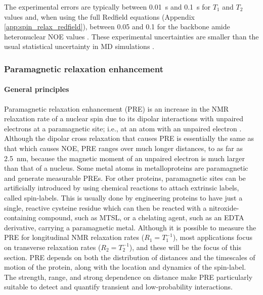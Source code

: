\documentclass[9pt,review]{livecoms}
\begin{document}
The experimental errors are typically between \qty{0.01}{\second} and \qty{0.1}{\second} for $T_1$ and $T_2$ values and, when using the full Redfield equations (Appendix \ref{app:spin_relax_redfield}), between 0.05 and 0.1 for the backbone amide heteronuclear NOE values \cite{hoch_biological_2023}.
These experimental uncertainties are smaller than the usual statistical uncertainty in MD simulations \cite{sandelin_qebss_2024}.

\subsubsection{Paramagnetic relaxation enhancement}
\label{sub2:pre}

\paragraph{General principles}

Paramagnetic relaxation enhancement (PRE) is an increase in the NMR relaxation rate of a nuclear spin due to its dipolar interactions with unpaired electrons at a paramagnetic site; i.e., at an atom with an unpaired electron \cite{clore_elucidating_2007,clore2009theory}.
Although the dipolar cross relaxation that causes PRE is essentially the same as that which causes NOE, PRE ranges over much longer distances, to as far as \qty{2.5}{\nano\meter}, because the magnetic moment of an unpaired electron is much larger than that of a nucleus.
Some metal atoms in metalloproteins are paramagnetic and generate measurable PREs.
For other proteins, paramagnetic sites can be artificially introduced by using chemical reactions to attach extrinsic labels, called spin-labels.
This is usually done by engineering proteins to have just a single, reactive cysteine residue which can then be reacted with a nitroxide-containing compound, such as MTSL, or a chelating agent, such as an EDTA derivative, carrying a paramagnetic metal.
Although it is possible to measure the PRE for longitudinal NMR relaxation rates ($R_1=T_1^{-1}$), most applications focus on transverse relaxation rates ($R_2=T_2^{-1}$), and these will be the focus of this section.
PRE depends on both the distribution of distances and the timescales of motion of the protein, along with the location and dynamics of the spin-label.
The strength, range, and strong dependence on distance make PRE particularly suitable to detect and quantify transient and low-probability interactions.
\end{document}
